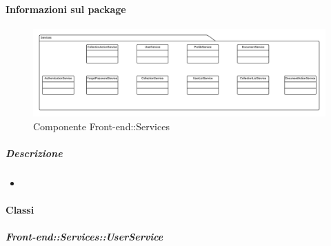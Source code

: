   \paragraph{Informazioni sul package}
    \begin{figure}[H] 
      \begin{center} 
        \includegraphics[width=\textwidth]{packages/Front-end::Services.png}  
        \caption{Componente Front-end::Services}
      \end{center}  
    \end{figure} 
  \subparagraph{Descrizione} 
    \begin{itemize}
    \item[] 
    \end{itemize} 
    \paragraph{Classi}
      \subparagraph{Front-end::Services::UserService}
        
